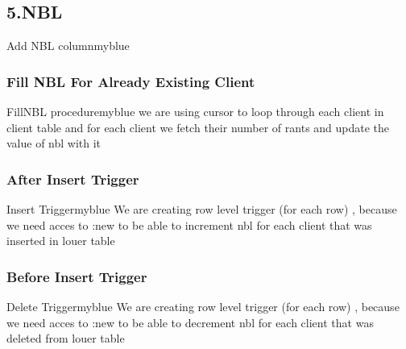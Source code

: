 \subsection*{5.NBL}
\begin{prettyBox}{Add NBL column}{myblue}

\end{prettyBox}

\vspace{0.25cm}

\subsubsection*{Fill NBL For Already Existing Client}



\begin{prettyBox}{FillNBL procedure}{myblue}
we are using cursor to loop through each client in client table and for each client we fetch their number of rants 
and update the value of nbl with it
\end{prettyBox}

\newpage

\subsubsection*{After Insert Trigger}



\begin{prettyBox}{Insert Trigger}{myblue}
We are creating row level trigger (for each row) , because we need acces to :new to be able to increment nbl for each client that was inserted in louer table
\end{prettyBox}

\vspace{0.25cm}

\subsubsection*{Before Insert Trigger}



\begin{prettyBox}{Delete Trigger}{myblue}
We are creating row level trigger (for each row) , because we need acces to :new to be able to decrement nbl for each client that was deleted from louer table
\end{prettyBox}


